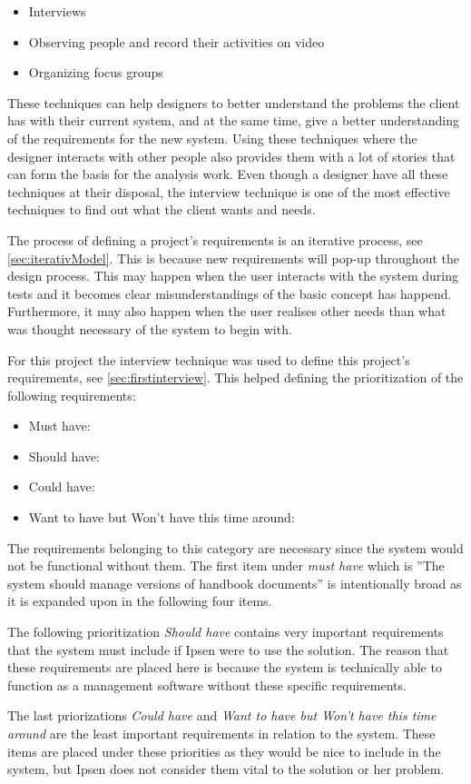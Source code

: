 \begin{itemize}
    \item Interviews
    \item Observing people and record their activities on video
    \item Organizing focus groups
\end{itemize}

These techniques can help designers to better understand the problems the client has with their current system, and at the same time, give a better understanding of the requirements for the new system.
Using these techniques where the designer interacts with other people also provides them with a lot of stories that can form the basis for the analysis work.
Even though a designer have all these techniques at their disposal, the interview technique
is one of the most effective techniques to find out what the client wants and needs.

The process of defining a project's requirements is an iterative process, see \cref{sec:iterativModel}.
This is because new requirements will pop-up throughout the design process.
This may happen when the user interacts with the system during tests and it becomes clear misunderstandings of the basic concept has happend.
Furthermore, it may also happen when the user realises other needs than what was thought necessary of the system to begin with.

For this project the interview technique was used to define this project's requirements, see {\color{red}\cref{sec:firstinterview}}. This helped defining the prioritization of the following requirements:

\begin{itemize}
	\item
		Must have:
		
		\newpage
	\item
		Should have:
		
	\item
		Could have:
		
	\item
		Want to have but Won't have this time around:
		

\end{itemize}

The requirements belonging to this category are necessary since the system would not be functional without them.
The first item under \textit{must have} which is ''The system should manage versions of handbook documents'' is intentionally broad as it is expanded upon in the following four items.

The following prioritization \textit{Should have} contains very important requirements that the system must include if Ipsen were to use the solution.
The reason that these requirements are placed here is because the system is technically able to function as a management software without these specific requirements.

The last priorizations \textit{Could have} and \textit{Want to have but Won't have this time around} are the least important requirements in relation to the system.
These items are placed under these priorities as they would be nice to include in the system, but Ipsen does not consider them vital to the solution or her problem.
